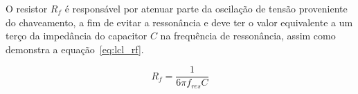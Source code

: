 \documentclass[
	12pt,				%
	openany,
	onseside,
	a4paper,			%
	english,			%
	french,				%
	spanish,			%
	brazil,				%
	]{abntex2}
\begin{document}
O resistor $R_f$ é responsável por atenuar parte da oscilação de tensão proveniente do chaveamento, a fim de evitar a ressonância e deve ter o valor equivalente a um terço da impedância do capacitor $C$ na frequência de ressonância\cite{LCL_FILTER_Reznik}, assim como demonstra a equação~\ref{eq:lcl_rf}.

\begin{equation}
	R_f = \frac{1}{6 \pi f_{res} C} \label{eq:lcl_rf}
\end{equation}



 

\end{document}
